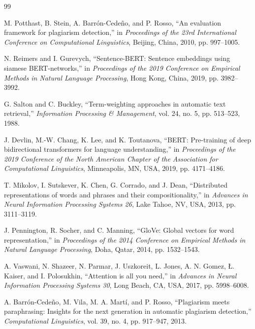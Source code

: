 \documentclass[conference]{IEEEtran}
\begin{document}
\begin{thebibliography}{99}

M. Potthast, B. Stein, A. Barrón-Cedeño, and P. Rosso, ``An evaluation framework for plagiarism detection,'' in \textit{Proceedings of the 23rd International Conference on Computational Linguistics}, Beijing, China, 2010, pp. 997--1005.

N. Reimers and I. Gurevych, ``Sentence-BERT: Sentence embeddings using siamese BERT-networks,'' in \textit{Proceedings of the 2019 Conference on Empirical Methods in Natural Language Processing}, Hong Kong, China, 2019, pp. 3982--3992.

G. Salton and C. Buckley, ``Term-weighting approaches in automatic text retrieval,'' \textit{Information Processing \& Management}, vol. 24, no. 5, pp. 513--523, 1988.

J. Devlin, M.-W. Chang, K. Lee, and K. Toutanova, ``BERT: Pre-training of deep bidirectional transformers for language understanding,'' in \textit{Proceedings of the 2019 Conference of the North American Chapter of the Association for Computational Linguistics}, Minneapolis, MN, USA, 2019, pp. 4171--4186.

T. Mikolov, I. Sutskever, K. Chen, G. Corrado, and J. Dean, ``Distributed representations of words and phrases and their compositionality,'' in \textit{Advances in Neural Information Processing Systems 26}, Lake Tahoe, NV, USA, 2013, pp. 3111--3119.

J. Pennington, R. Socher, and C. Manning, ``GloVe: Global vectors for word representation,'' in \textit{Proceedings of the 2014 Conference on Empirical Methods in Natural Language Processing}, Doha, Qatar, 2014, pp. 1532--1543.

A. Vaswani, N. Shazeer, N. Parmar, J. Uszkoreit, L. Jones, A. N. Gomez, Ł. Kaiser, and I. Polosukhin, ``Attention is all you need,'' in \textit{Advances in Neural Information Processing Systems 30}, Long Beach, CA, USA, 2017, pp. 5998--6008.

A. Barrón-Cedeño, M. Vila, M. A. Martí, and P. Rosso, ``Plagiarism meets paraphrasing: Insights for the next generation in automatic plagiarism detection,'' \textit{Computational Linguistics}, vol. 39, no. 4, pp. 917--947, 2013.

\end{thebibliography}
\end{document}
